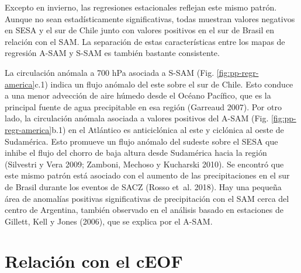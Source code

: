 \documentclass[12pt,oneside,a4paper]{reedthesis}
\begin{document}
Excepto en invierno, las regresiones estacionales reflejan este mismo patrón.
Aunque no sean estadísticamente significativas, todas muestran valores negativos en SESA y el sur de Chile junto con valores positivos en el sur de Brasil en relación con el SAM.
La separación de estas características entre los mapas de regresión A-SAM y S-SAM es también bastante consistente.

La circulación anómala a 700 hPa asociada a S-SAM (Fig. \ref{fig:pp-regr-america}c.1) indica un flujo anómalo del este sobre el sur de Chile.
Esto conduce a una menor advección de aire húmedo desde el Océano Pacífico, que es la principal fuente de agua precipitable en esa región (Garreaud 2007).
Por otro lado, la circulación anómala asociada a valores positivos del A-SAM (Fig. \ref{fig:pp-regr-america}b.1) en el Atlántico es anticiclónica al este y ciclónica al oeste de Sudamérica.
Esto promueve un flujo anómalo del sudeste sobre el SESA que inhibe el flujo del chorro de baja altura desde Sudamérica hacia la región (Silvestri y Vera 2009; Zamboni, Mechoso y Kucharski 2010).
Se encontró que este mismo patrón está asociado con el aumento de las precipitaciones en el sur de Brasil durante los eventos de SACZ (Rosso et~al. 2018).
Hay una pequeña área de anomalías positivas significativas de precipitación con el SAM cerca del centro de Argentina, también observado en el análisis basado en estaciones de Gillett, Kell y Jones (2006), que se explica por el A-SAM.

\hypertarget{relaciuxf3n-con-el-ceof}{%
\section{Relación con el cEOF}\label{relaciuxf3n-con-el-ceof}}
\end{document}
